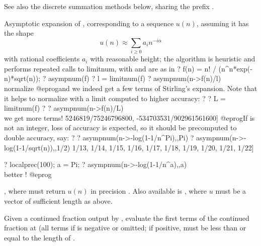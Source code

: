 See also the discrete summation methods below, sharing the prefix .


\label{se:asympnum}
Asymptotic expansion of , corresponding to a sequence $u(n)$,
assuming it has the shape
$$u(n) \approx \sum_{i \geq 0} a_i n^{-i\alpha}$$
with rational coefficients $a_i$ with reasonable height; the algorithm
is heuristic and performs repeated calls to limitnum, with
 and  are as in 
\bprog
? f(n) = n! / (n^n*exp(-n)*sqrt(n));
? asympnum(f)
? l = limitnum(f)
? asympnum(n->f(n)/l) \\ normalize
@eprog\noindent and we indeed get a few terms of Stirling's expansion. Note
that it helps to normalize with a limit computed to higher accuracy:
\bprog
? 
? L = limitnum(f)
? 
? asympnum(n->f(n)/L) \\ we get more terms!
      5246819/75246796800, -534703531/902961561600]
@eprog\noindent If  is not an integer, loss of accuracy is
expected, so it should be precomputed to double accuracy, say:
\bprog
? 
? asympnum(n->-log(1-1/n^Pi),,Pi)
? asympnum(n->-log(1-1/sqrt(n)),,1/2)
  1/13, 1/14, 1/15, 1/16, 1/17, 1/18, 1/19, 1/20, 1/21, 1/22]

? localprec(100); a = Pi;
? asympnum(n->-log(1-1/n^a),,a) \\ better !
@eprog

, where  must return $u(n)$ in precision .
Also available is
, where $u$
must be a vector of sufficient length as above.

\label{se:contfraceval}
Given a continued fraction  output by , evaluate
the first  terms of the continued fraction at  (all
terms if  is negative or omitted; if positive,  must be
less than or equal to the length of .

